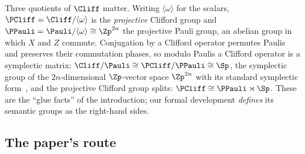 Three quotients of $\Cliff$ matter.  Writing $\langle\omega\rangle$ for
the scalars, $\PCliff = \Cliff/\langle\omega\rangle$ is the
\emph{projective} Clifford group and $\PPauli =
\Pauli/\langle\omega\rangle \cong \Zp^{2n}$ the projective Pauli group,
an abelian group in which $X$ and $Z$ commute.  Conjugation by a Clifford
operator permutes Paulis and preserves their commutation phases, so
modulo Paulis a Clifford operator is a symplectic matrix: $\Cliff/\Pauli
\cong \PCliff/\PPauli \cong \Sp$, the symplectic group of the
$2n$-dimensional $\Zp$-vector space $\Zp^{2n}$ with its standard
symplectic form~\cite{bian2026qudit}, and the projective Clifford group
splits: $\PCliff \cong \PPauli \rtimes \Sp$.  These are the ``glue
facts'' of the introduction; our formal development \emph{defines} its
semantic groups as the right-hand sides.

\subsection{The paper's route}

